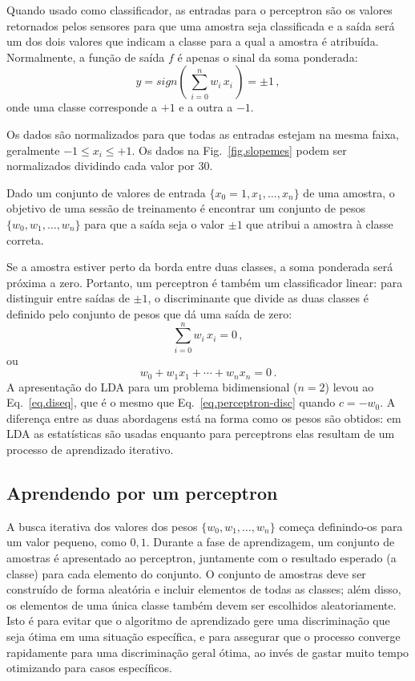Quando usado como classificador, as entradas para o perceptron são os valores retornados pelos sensores para que uma amostra seja classificada e a saída será um dos dois valores que indicam a classe para a qual a amostra é atribuída. Normalmente, a função de saída $f$ é apenas o sinal da soma ponderada:
\begin{equation}
y=sign\left(\,\sum_{i=0}^{n} w_i\,x_i\,\right)=\pm 1\,,\label{eq.perceptron-output}
\end{equation}
onde uma classe corresponde a $+1$ e a outra a $-1$.

Os dados são normalizados para que todas as entradas estejam na mesma faixa, geralmente $-1\leq x_i\leq +1$. Os dados na Fig.~\ref{fig.slopemes} podem ser normalizados dividindo cada valor por $30$.

Dado um conjunto de valores de entrada $\{x_0=1,x_1,\ldots,x_n\}$ de uma amostra, o objetivo de uma sessão de treinamento é encontrar um conjunto de pesos $\{w_0,w_1,\ldots,w_n\}$ para que a saída seja o valor $\pm 1$ que atribui a amostra à classe correta.

Se a amostra estiver perto da borda entre duas classes, a soma ponderada será próxima a zero. Portanto, um perceptron é também um classificador linear: para distinguir entre saídas de $\pm 1$, o discriminante que divide as duas classes é definido pelo conjunto de pesos que dá uma saída de zero:
\[
\sum_{i=0}^{n} w_i\,x_i=0\,,
\]
ou
\begin{equation}
w_0 + w_1x_1 + \cdots + w_nx_n = 0\,.\label{eq.perceptron-disc}
\end{equation}
A apresentação do LDA para um problema bidimensional ($n=2$) levou ao Eq.~\ref{eq.diseq}, que é o mesmo que Eq.~\ref{eq.perceptron-disc} quando $c=-w_0$. A diferença entre as duas abordagens está na forma como os pesos são obtidos: em LDA as estatísticas são usadas enquanto para perceptrons elas resultam de um processo de aprendizado iterativo.

\subsection{Aprendendo por um perceptron}

A busca iterativa dos valores dos pesos $\{w_0,w_1,\ldots,w_n\}$ começa definindo-os para um valor pequeno, como $0,1$. Durante a fase de aprendizagem, um conjunto de amostras é apresentado ao perceptron, juntamente com o resultado esperado (a classe) para cada elemento do conjunto. O conjunto de amostras deve ser construído de forma aleatória e incluir elementos de todas as classes; além disso, os elementos de uma única classe também devem ser escolhidos aleatoriamente. Isto é para evitar que o algoritmo de aprendizado gere uma discriminação que seja ótima em uma situação específica, e para assegurar que o processo converge rapidamente para uma discriminação geral ótima, ao invés de gastar muito tempo otimizando para casos específicos.

